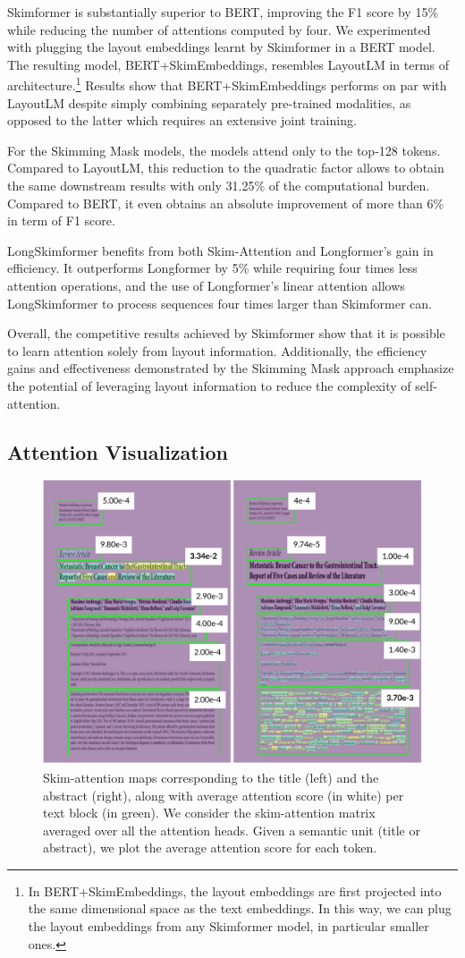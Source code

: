 Skimformer is substantially superior to \ac{BERT}, improving the F1 score by 15\% while reducing the number of attentions computed by four. We experimented with plugging the layout embeddings learnt by Skimformer in a \ac{BERT} model. The resulting model, BERT+SkimEmbeddings, resembles LayoutLM in terms of architecture.\footnote{In BERT+SkimEmbeddings, the layout embeddings are first projected into the same dimensional space as the text embeddings. In this way, we can plug the layout embeddings from any Skimformer model, in particular smaller ones.} Results show that BERT+SkimEmbeddings performs on par with LayoutLM despite simply combining separately pre-trained modalities, as opposed to the latter which requires an extensive joint training.

For the Skimming Mask models, the models attend only to the top-128 tokens. Compared to LayoutLM, this reduction to the quadratic factor allows to obtain the same downstream results with only 31.25\% of the computational burden.
Compared to \ac{BERT}, it even obtains an absolute improvement of more than 6\% in term of F1 score.

LongSkimformer benefits from both Skim-Attention and Longformer's gain in efficiency. It outperforms Longformer by 5\% while requiring four times less attention operations, and the use of Longformer's linear attention allows LongSkimformer to process sequences four times larger than Skimformer can.

Overall, the competitive results achieved by Skimformer show that it is possible to learn attention solely from layout information. Additionally, the efficiency gains and effectiveness demonstrated by the Skimming Mask approach emphasize the potential of leveraging layout information to reduce the complexity of self-attention.

\subsection{Attention Visualization}
\label{subsection:attention-visualization}

\begin{figure}
    \centering \small
    \includegraphics[width=.49\textwidth]{images/chapter3/attention-maps_with-average.pdf}
    \caption{Skim-attention maps corresponding to the title (left) and the abstract (right), along with average attention score (in white) per text block (in green). We consider the skim-attention matrix averaged over all the attention heads. Given a semantic unit (title or abstract), we plot the average attention score for each token.
    }
    \label{fig:attention-vis}
\end{figure}

